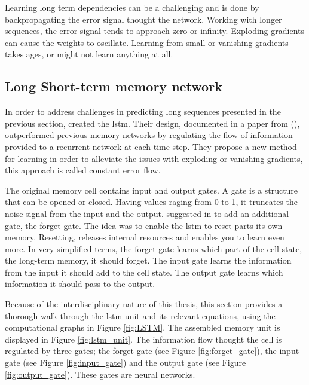 Learning long term dependencies can be a challenging and is done by backpropagating the error signal thought the network. Working with longer sequences, the error signal tends to approach zero or infinity. Exploding gradients can cause the weights to oscillate. Learning from small or vanishing gradients takes ages, or might not learn anything at all. 

\subsection{Long Short-term memory network} \label{sec:lstm}
In order to address challenges in predicting long sequences presented in the previous section, \citeauthor{Hochreiter1997LongMemory} created the \acrfull{lstm}. Their design, documented in a paper from \citeyear{Hochreiter1997LongMemory} (\cite{Hochreiter1997LongMemory}), outperformed previous memory networks by regulating the flow of information provided to a recurrent network at each time step.
They propose a new method for learning %
in order to alleviate the issues with exploding or vanishing gradients, this approach is called constant error flow. 

The original memory cell contains input and output gates. A gate is a structure that can be opened or closed. Having values raging from 0 to 1, it truncates the noise signal from the input and the output. \citeauthor{lstm_learning_to_forget} suggested in \citeyear{lstm_learning_to_forget} to add an additional gate, the forget gate. The idea was to enable the \acrshort{lstm} to reset parts its own memory. Resetting, releases internal resources and enables you to learn even more. In very simplified terms, the forget gate learns which part of the cell state, the long-term memory, it should forget. The input gate learns the information from the input it should add to the cell state. The output gate learns which information it should pass to the output. 


Because of the interdisciplinary nature of this thesis, this section provides a thorough walk through the \acrshort{lstm} unit and its relevant equations, using the computational graphs in Figure \ref{fig:LSTM}. The assembled memory unit is displayed in Figure \ref{fig:lstm_unit}. The information flow thought the cell is regulated by three gates; the forget gate (see Figure \ref{fig:forget_gate}), the input gate (see Figure \ref{fig:input_gate}) and the output gate (see Figure \ref{fig:output_gate}). These gates are neural networks. 

